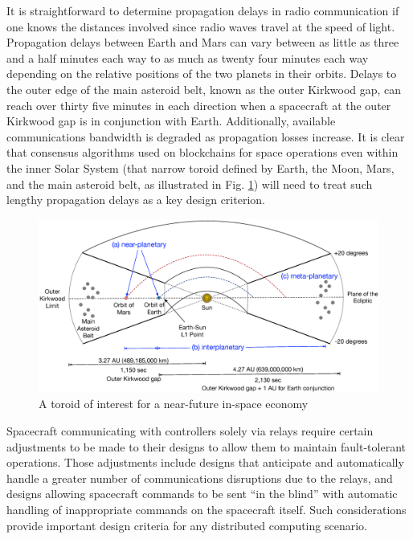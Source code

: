 \documentclass[]{aiaa-tc}%
\begin{document}
It is straightforward to determine propagation delays in radio communication if one knows the distances involved since radio waves travel at the speed of light. Propagation delays between Earth and Mars can vary between as little as three and a half minutes each way 
to
 as much as twenty four minutes each way depending on the relative positions of the two planets in their orbits. Delays to the outer edge of the main asteroid belt, known as the outer Kirkwood gap, can reach over thirty five minutes in each direction when a spacecraft at the outer Kirkwood gap is in conjunction with Earth. Additionally, available communications bandwidth is degraded as propagation losses increase. It is clear that consensus algorithms used on blockchains for space operations even within the inner Solar System (that narrow toroid defined by Earth, the Moon, Mars, and the main asteroid belt, as illustrated in Fig. \ref{f:fig1-toroid-of-interest}) will need to treat such lengthy propagation delays as a key design criterion.

\begin{figure}[htb]%
 \includegraphics{figures/fig1-toroid-of-interest}
 \caption{A toroid of interest for a near-future in-space economy}
 \label{f:fig1-toroid-of-interest}
\end{figure}

Spacecraft communicating with controllers solely via relays require certain adjustments to be made to their designs to allow them to maintain fault-tolerant operations\cite{lewicki_phoenix_2006}. Those adjustments include designs that anticipate and automatically handle a greater number of communications disruptions due to the relays, and designs allowing spacecraft commands to be sent ``in the blind'' with automatic handling of inappropriate commands on the spacecraft itself. Such considerations provide important design criteria for any distributed computing scenario.
\end{document}
